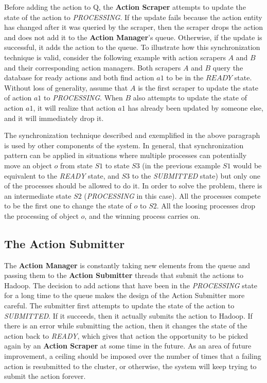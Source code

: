 Before adding the action to Q, the \textbf{Action Scraper} attempts to update the state of the action to \textit{PROCESSING}. If the update fails because the action entity has changed after it was queried by the scraper, then the scraper drops the action and does not add it to the \textbf{Action Manager}'s queue. Otherwise, if the update is successful, it adds the action to the queue. To illustrate how this synchronization technique is valid, consider the following example with action scrapers $A$ and $B$ and their corresponding action managers. Both scrapers $A$ and $B$ query the database for ready actions and both find action $a1$ to be in the $READY$ state. Without loss of generality, assume that $A$ is the first scraper to update the state of action $a1$ to \textit{PROCESSING}. When $B$ also attempts to update the state of action $a1$, it will realize that action $a1$ has already been updated by someone else, and it will immediately drop it.

The synchronization technique described and exemplified in the above paragraph is used by other components of the system. In general, that synchronization pattern can be applied in situations where multiple processes can potentially move an object $o$ from state $S1$ to state $S3$ (in the previous example $S1$ would be equivalent to the \textit{READY} state, and $S3$ to the \textit{SUBMITTED} state) but only one of the processes should be allowed to do it. In order to solve the problem, there is an intermediate state $S2$ (\textit{PROCESSING} in this case).  All the processes compete to be the first one to change the state of $o$ to $S2$. All the loosing processes drop the processing of object $o$, and the winning process carries on.

\subsection{The Action Submitter}
The \textbf{Action Manager} is constantly taking new elements from the queue and passing them to the \textbf{Action Submitter} threads that submit the actions to Hadoop. The decision to add actions that have been in the \textit{PROCESSING} state for a long time to the queue makes the design of the Action Submitter more careful. The submitter first attempts to update the state of the action to \textit{SUBMITTED}. If it succeeds, then it actually submits the action to Hadoop. If there is an error while submitting the action, then it changes the state of the action back to \textit{READY}, which gives that action the opportunity to be picked again by an \textbf{Action Scraper} at some time in the future. As an area of future improvement, a ceiling should be imposed over the number of times that a failing action is resubmitted to the cluster, or otherwise, the system will keep trying to submit the action forever.

